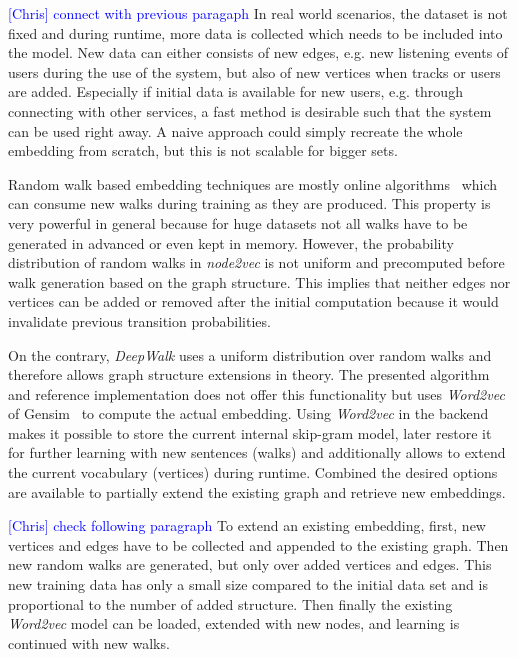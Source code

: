 \documentclass[sigconf]{acmart}
\newcommand{\ce}[1]{\textcolor{blue}{[Chris] #1}}
\newcommand{\ce}[1]{}
\begin{document}
\ce{connect with previous paragaph}
In real world scenarios, the dataset is not fixed and during runtime, more data is collected which needs to be included into the model. New data can either consists of new edges, e.g. new listening events of users during the use of the system, but also of new vertices when tracks or users are added. Especially if initial data is available for new users, e.g. through connecting with other services, a fast method is desirable such that the system can be used right away. A naive approach could simply recreate the whole embedding from scratch, but this is not scalable for bigger sets.



 

Random walk based embedding techniques are mostly online algorithms~\cite{perozzi2014deepwalk}\cite{grover2016node2vec} which can consume new walks during training as they are produced. This property is very powerful in general because for huge datasets not all walks have to be generated in advanced or even kept in memory. However, the probability distribution of random walks in \emph{node2vec} is not uniform and precomputed before walk generation based on the graph structure. This implies that neither edges nor vertices can be added or removed after the initial computation because it would invalidate previous transition probabilities.

On the contrary, \emph{DeepWalk} uses a uniform distribution over random walks and therefore allows graph structure extensions in theory. The presented algorithm and reference implementation does not offer this functionality but uses \emph{Word2vec} of Gensim~\cite{rehurek_lrec} to compute the actual embedding. Using \emph{Word2vec} in the backend makes it possible to store the current internal skip-gram model, later restore it for further learning with new sentences (walks) and additionally allows to extend the current vocabulary (vertices) during runtime. Combined the desired options are available to partially extend the existing graph and retrieve new embeddings.

\ce{check following paragraph}
To extend an existing embedding, first, new vertices and edges have to be collected and appended to the existing graph. Then new random walks are generated, but only over added vertices and edges. This new training data has only a small size compared to the initial data set and is proportional to the number of added structure. Then finally the existing \emph{Word2vec} model can be loaded, extended with new nodes, and learning is continued with new walks. \\
\end{document}
